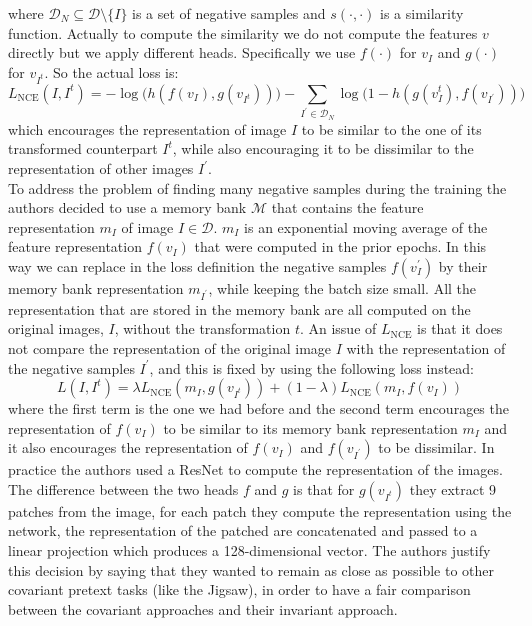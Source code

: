 where $\mathcal{D}_N \subseteq \mathcal{D} \setminus \{I\}$ is a set of negative samples and $s(\cdot, \cdot)$ is a similarity function. Actually to compute the similarity we do not compute the features $v$ directly but we apply different heads. Specifically we use $f(\cdot)$ for $v_I$ and $g(\cdot)$ for $v_{I^t}$. So the actual loss is:
\[L_{\text{NCE}}(I, I^t) = -\log\big(h(f(v_I), g(v_{I^t}))\big) - \sum_{I^\prime \in \mathcal{D}_N} \log\big(1 - h(g(v^t_I), f(v_{I^\prime}))\big) \]
which encourages the representation of image $I$ to be similar to the one of its transformed counterpart $I^t$, while also encouraging it to be dissimilar to the representation of other images $I^\prime$.\\
To address the problem of finding many negative samples during the training the authors decided to use a memory bank $\mathcal{M}$ that contains the feature representation $m_I$ of image $I \in \mathcal{D}$. $m_I$ is an exponential moving average of the feature representation $f(v_I)$ that were computed in the prior epochs. In this way we can replace in the loss definition the negative samples $f(v^\prime_I)$ by their memory bank representation $m_{I^\prime}$, while keeping the batch size small. All the representation that are stored in the memory bank are all computed on the original images, $I$, without the transformation $t$. An issue of $L_{\text{NCE}}$ is that it does not compare the representation of the original image $I$ with the representation of the negative samples $I^\prime$, and this is fixed by using the following loss instead:
\[ L(I,I^t) = \lambda L_{\text{NCE}}(m_I, g(v_{I^t})) + (1-\lambda)L_{\text{NCE}}(m_I, f(v_I)) \]
where the first term is the one we had before and the second term encourages the representation of $f(v_I)$ to be similar to its memory bank representation $m_I$ and it also encourages the representation of $f(v_I)$ and $f(v_{I^\prime})$ to be dissimilar.
In practice the authors used a ResNet to compute the representation of the images. The difference between the two heads $f$ and $g$ is that for $g(v_{I^t})$ they extract 9 patches from the image, for each patch they compute the representation using the network, the representation of the patched are concatenated and passed to a linear projection which produces a 128-dimensional vector. The authors justify this decision by saying that they wanted to remain as close as possible to other covariant pretext tasks (like the Jigsaw), in order to have a fair comparison between the covariant approaches and their invariant approach.
